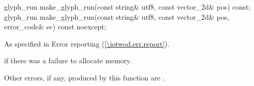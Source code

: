 \begin{itemdecl}
glyph_run make_glyph_run(const string& utf8, const vector_2d& pos) const;
glyph_run make_glyph_run(const string& utf8, const vector_2d& pos, 
  error_code& ec) const noexcept;
\end{itemdecl}
\begin{itemdescr}
\pnum
\returns

\pnum
\throws
As specified in Error reporting (\ref{\iotwod.err.report}).

\pnum
\errors
{} if there was a failure to allocate memory.

\pnum
Other errors, if any, produced by this function are .

\end{itemdescr}
